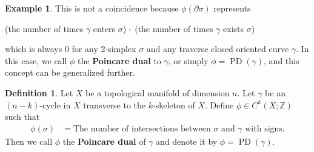 \documentclass[psamsfonts]{amsart}
\theoremstyle{definition}
\newtheorem{defn}[thm]{Definition}
\newtheorem{exmp}[thm]{Example}
\theoremstyle{rem}
\DeclareMathOperator{\PD}{PD}
\numberwithin{equation}{section}
\begin{document}
\begin{exmp}
  This is not a coincidence because $\phi(\partial\sigma)$ represents 
  \begin{center}
    (the number of times $\gamma$ enters $\sigma$) - (the number of times $\gamma$ exists $\sigma$)
  \end{center}
  which is always 0 for any 2-simplex $\sigma$ and any traverse closed oriented curve $\gamma$.
  In this case, we call $\phi$ the \textbf{Poincare dual} to $\gamma$, or simply $\phi = \PD(\gamma)$, and this concept can be generalized further.
\end{exmp}

\begin{defn}
  Let $X$ be a topological manifold of dimension $n$.
  Let $\gamma$ be an $(n - k)$-cycle in $X$ transverse to the $k$-skeleton of $X$.
  Define $\phi \in C^{k}(X; \mathbb{Z})$ such that
  \begin{align*}
    \phi(\sigma) &= \text{The number of intersections between $\sigma$ and $\gamma$ with signs}.
  \end{align*}
  Then we call $\phi$ the \textbf{Poincare dual} of $\gamma$ and denote it by $\phi = \PD(\gamma)$.
\end{defn}
\end{document}
